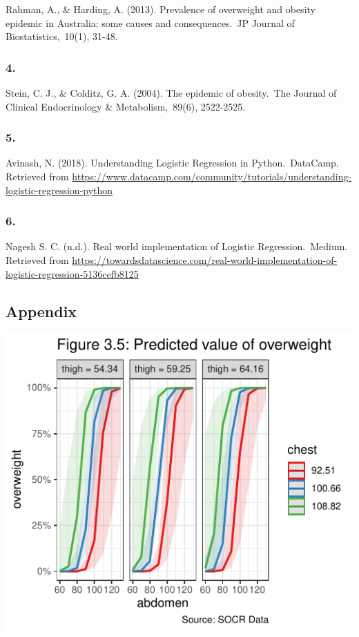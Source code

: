 \documentclass[a4paper,9pt,twocolumn,twoside,]{pinp}
\begin{document}
Rahman, A., \& Harding, A. (2013). Prevalence of overweight and obesity
epidemic in Australia: some causes and consequences.~JP Journal of
Biostatistics,~10(1), 31-48.

\hypertarget{section-3}{%
\subsubsection{4.}\label{section-3}}

Stein, C. J., \& Colditz, G. A. (2004). The epidemic of obesity.~The
Journal of Clinical Endocrinology \& Metabolism,~89(6), 2522-2525.

\hypertarget{section-4}{%
\subsubsection{5.}\label{section-4}}

Avinash, N. (2018). Understanding Logistic Regression in
Python.~DataCamp. Retrieved from
\url{https://www.datacamp.com/community/tutorials/understanding-logistic-regression-python}

\hypertarget{section-5}{%
\subsubsection{6.}\label{section-5}}

Nagesh S. C. (n.d.). Real world implementation of Logistic
Regression.~Medium. Retrieved from
\url{https://towardsdatascience.com/real-world-implementation-of-logistic-regression-5136cefb8125}

\hypertarget{appendix}{%
\subsection{Appendix}\label{appendix}}

\begin{center}\includegraphics{Executive-Report_files/figure-latex/unnamed-chunk-3-1} \end{center}
\end{document}

